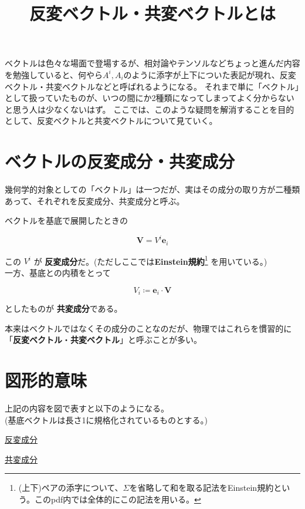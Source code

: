 \documentclass[a4paper,11pt]{article}
\title{\vspace{-40mm}反変ベクトル・共変ベクトルとは}
\author{}
\begin{document}
\maketitle

ベクトルは色々な場面で登場するが、相対論やテンソルなどちょっと進んだ内容を勉強していると、何やら$A^i, A_i$のように添字が上下についた表記が現れ、反変ベクトル・共変ベクトルなどと呼ばれるようになる。
それまで単に「ベクトル」として扱っていたものが、いつの間にか2種類になってしまってよく分からないと思う人は少なくないはず。
ここでは、このような疑問を解消することを目的として、反変ベクトルと共変ベクトルについて見ていく。

\section{ベクトルの反変成分・共変成分}

幾何学的対象としての「ベクトル」は一つだが、実はその成分の取り方が二種類あって、それぞれを反変成分、共変成分と呼ぶ。

ベクトルを基底で展開したときの

\begin{equation}
  \mathbf{V} = V^i \mathbf{e}_i
\end{equation}

\noindent
この \(V^i\) が \textbf{反変成分}だ。(ただしここでは\textbf{Einstein規約}\footnote{
  (上下)ペアの添字について、$\Sigma$を省略して和を取る記法をEinstein規約という。このpdf内では全体的にこの記法を用いる。
}
を用いている。)\\
\noindent
一方、基底との内積をとって

\begin{equation}
  V_i \coloneqq \mathbf{e}_i \cdot \mathbf{V}
  \label{eq:covariance}
\end{equation}

\noindent
としたものが \textbf{共変成分}である。

本来はベクトルではなくその成分のことなのだが、物理ではこれらを慣習的に「\textbf{反変ベクトル}・\textbf{共変ベクトル}」と呼ぶことが多い。

\section{図形的意味}

上記の内容を図で表すと以下のようになる。 \\
(基底ベクトルは長さ1に規格化されているものとする。)

\medskip
\noindent
\begin{minipage}[t]{0.42\linewidth}
  \raggedright
  \underline{反変成分}\par\smallskip
  \centering
  
\end{minipage}
\hspace{0.10\linewidth}
\begin{minipage}[t]{0.42\linewidth}
  \raggedright
  \underline{共変成分}\par\smallskip
  \centering
  
\end{minipage}
\end{document}
